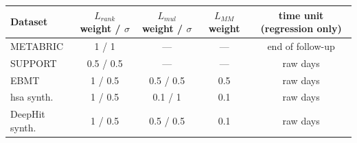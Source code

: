 \begin{tabular}{lcccc}
\toprule
Dataset & $L_{rank}$ weight / $\sigma$ & $L_{mul}$ weight / $\sigma$ & $L_{MM}$ weight & time unit (regression only) \\
\midrule
METABRIC & 1 / 1 & --- & --- & end of follow-up \\
SUPPORT & 0.5 / 0.5 & --- & --- & raw days \\
EBMT & 1 / 0.5 & 0.5 / 0.5 & 0.5 & raw days \\
hsa synth. & 1 / 0.5 & 0.1 / 1 & 0.1 & raw days \\
DeepHit synth. & 1 / 0.5 & 0.5 / 0.5 & 0.1 & raw days \\
\bottomrule
\end{tabular}
